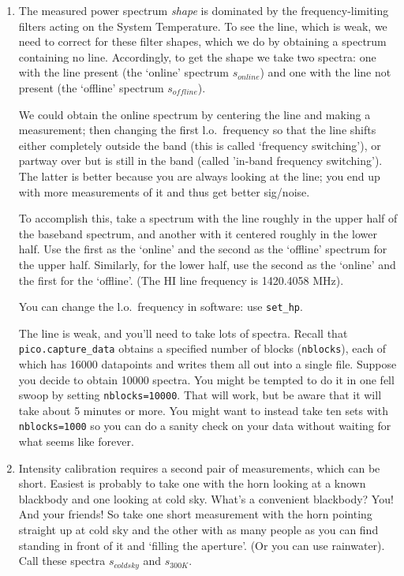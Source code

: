 \documentclass[12pt,preprint]{aastex}
\begin{document}
\begin{enumerate}

\item 
The measured power spectrum {\it shape} is dominated by the
frequency-limiting filters acting on the System Temperature. To see the
line, which is weak, we need to correct for these filter shapes, which
we do by obtaining a spectrum containing no line. Accordingly, to get
the shape we take two spectra: one with the line present (the `online'
spectrum $s_{online}$) and one with the line not present (the `offline'
spectrum $s_{offline}$).

We could obtain the online
  spectrum by centering the line and making a measurement; then changing
  the first l.o.\ frequency so that the line shifts either completely
  outside the band (this is called `frequency switching'), or partway
  over but is still in the band (called 'in-band frequency
  switching'). The latter is better because you are always looking at
  the line; you end up with more measurements of it and thus get better sig/noise.

To accomplish this, take a spectrum with the line roughly in the upper
half of the baseband spectrum, and another with it centered roughly in
the lower half. Use the first as the `online' and the second as the
`offline' spectrum for the upper half. Similarly, for the lower half,
use the second as the `online' and the first for the `offline'.  (The HI
line frequency is 1420.4058 MHz).

You can change the l.o.\ frequency in software: use {\tt set\_hp}. %

The line is weak, and you'll need to take lots of spectra. Recall that
{\tt pico.capture\_data} obtains a specified number of blocks ({\tt nblocks}),
each of which has 16000 datapoints and writes them all out into a single
file. Suppose you decide to obtain 10000 spectra. You might be tempted
to do it in one fell swoop by setting {\tt nblocks=10000}. That
will work, but be aware that it will take about 5 minutes or more. You
might want to instead take ten sets with {\tt nblocks=1000} so you can do a
sanity check on your data without waiting for what seems like forever. 

\item Intensity calibration requires a second pair of measurements,
  which can be short. Easiest is probably to take one with the horn
  looking at a known blackbody and one looking at cold sky. What's a
  convenient blackbody? You! And your friends! So take one short
  measurement with the horn pointing straight up at cold sky and the
  other with as many people as you can find standing in front of it and
  `filling the aperture'. (Or you can use rainwater). Call these spectra
  $s_{coldsky}$ and $s_{300K}$.

\end{enumerate}
\end{document}
